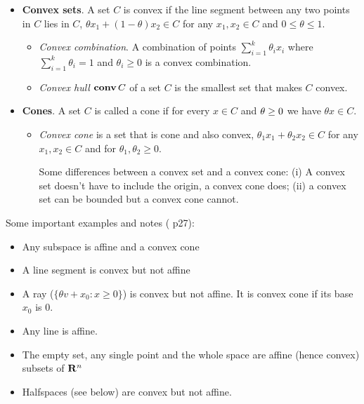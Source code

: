 \documentclass[a4paper, oneside]{book}
\begin{document}
\begin{itemize}
\begin{itemize}
	\end{itemize} 
\item \textbf{Convex sets}. A set $C$ is convex if the line segment between any two points in $C$ lies in $C$, \ie  $\theta x_1 +(1-\theta) x_2 \in C$ for any $x_1,x_2 \in C$ and $0 \le \theta \le 1$.
	\begin{itemize}
	\item \textit{Convex combination}. A combination of points $\sum_{i=1}^k \theta_i x_i$ where $\sum_{i=1}^k\theta_i = 1$ and $\theta_i\ge 0$ is a convex combination.
	\item \textit{Convex hull} $\textbf{conv}\,C$ of a set $C$ is the smallest set that makes $C$ convex.
	\end{itemize}
\item \textbf{Cones}. A set $C$ is called a cone if for every $x \in C$ and $\mathbf \theta \ge 0$ we have $\theta x \in C$.
	\begin{itemize}
	\item \textit{Convex cone} is a set that is cone and also convex, \ie $\theta_1 x_1 + \theta_2 x_2 \in C$ for any $x_1, x_2 \in C$ and for $\theta_1, \theta_2 \ge 0$.
	
	Some differences between a convex set and a convex cone: (i) A convex set doesn't have to include the origin, a convex cone does; (ii) a convex set can be bounded but a convex cone cannot. 
	
	\end{itemize}
\end{itemize}

Some important examples and notes (\cite{boyd04} p27):
\begin{itemize}
\item Any subspace is affine and a convex cone
\item A line segment is convex but not affine
\item A ray (\ie $\{\theta v + x_0 : x\ge 0\}$) is convex but not affine. It is convex cone if its base $x_0$ is 0.
\item Any line is affine. 
\item The empty set, any single point and the whole space are affine (hence convex) subsets of $\mathbf R^n$
\item Halfspaces (see below) are convex but not affine.
\end{itemize}
\end{document}
